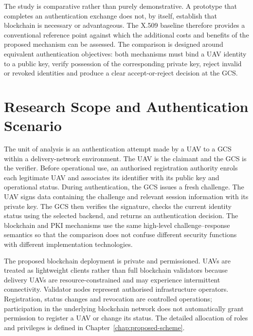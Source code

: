 The study is comparative rather than purely demonstrative. A prototype that completes an authentication exchange does not, by itself, establish that blockchain is necessary or advantageous. The X.509 baseline therefore provides a conventional reference point against which the additional costs and benefits of the proposed mechanism can be assessed. The comparison is designed around equivalent authentication objectives: both mechanisms must bind a UAV identity to a public key, verify possession of the corresponding private key, reject invalid or revoked identities and produce a clear accept-or-reject decision at the GCS.

\section{Research Scope and Authentication Scenario}
\label{sec:scope-authentication-scenario}

The unit of analysis is an authentication attempt made by a UAV to a GCS within a delivery-network environment. The UAV is the claimant and the GCS is the verifier. Before operational use, an authorised registration authority enrols each legitimate UAV and associates its identifier with its public key and operational status. During authentication, the GCS issues a fresh challenge. The UAV signs data containing the challenge and relevant session information with its private key. The GCS then verifies the signature, checks the current identity status using the selected backend, and returns an authentication decision. The blockchain and PKI mechanisms use the same high-level challenge--response semantics so that the comparison does not confuse different security functions with different implementation technologies.

The proposed blockchain deployment is private and permissioned. UAVs are treated as lightweight clients rather than full blockchain validators because delivery UAVs are resource-constrained and may experience intermittent connectivity. Validator nodes represent authorised infrastructure operators. Registration, status changes and revocation are controlled operations; participation in the underlying blockchain network does not automatically grant permission to register a UAV or change its status. The detailed allocation of roles and privileges is defined in Chapter~\ref{chap:proposed-scheme}.

